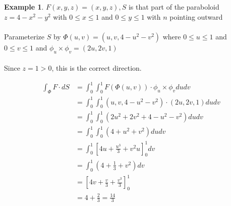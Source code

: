 \documentclass[12pt]{article}
\theoremstyle{plain}
\theoremstyle{definition}
\newtheorem{example}[theorem]{Example}
\begin{document}
\begin{example}
	$F(x,y,z) = (x,y,z), S$ is that part of the paraboloid $z=4-x^2-y^2$ with $0 \leq x \leq 1$ and $0 \leq y \leq 1$ with $n$ pointing outward\\
	\\
	Parameterize $S$ by $\Phi (u,v) = (u,v, 4-u^2-v^2)$ where $0 \leq u \leq 1$ and $0 \leq v \leq 1$ and $\phi_u \times \phi_v = (2u, 2v, 1)$\\
	\\
	Since $z=1 > 0$, this is the correct direction.

	\begin{align*}
		\int_\Phi F \cdot dS &= \int_0^1 \int_0^1 F(\Phi (u,v)) \cdot \phi_u \times \phi_v dudv\\
		&= \int_0^1 \int_0^1 (u,v,4-u^2-v^2) \cdot (2u, 2v, 1) dudv\\
		&= \int_0^1 \int_0^1 (2u^2 + 2v^2 + 4-u^2-v^2)dudv\\
		&= \int_0^1 \int_0^1 (4+u^2+v^2) dudv\\
		&= \int_0^1 [4u+ \frac{u^3}{3} + v^2 u]^1_0 dv\\
		&= \int_0^1 (4+\frac{1}{3} + v^2)dv\\
		&=[4v + \frac{v}{3} + \frac{v^3}{3}]_0^1\\
		&= 4 + \frac{2}{3} = \frac{14}{3}
	\end{align*}

\end{example}
\end{document}
